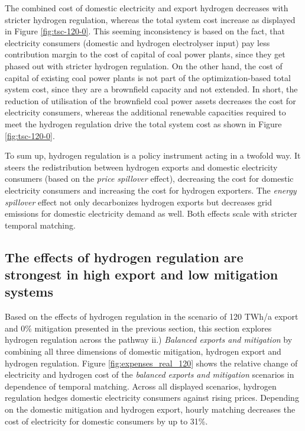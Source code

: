 The combined cost of domestic electricity and export hydrogen decreases with stricter hydrogen regulation, whereas the total system cost increase as displayed in Figure \ref{fig:tsc-120-0}. This seeming inconsistency is based on the fact, that electricity consumers (domestic and hydrogen electrolyser input) pay less contribution margin to the cost of capital of coal power plants, since they get phased out with stricter hydrogen regulation. On the other hand, the cost of capital of existing coal power plants is not part of the optimization-based total system cost, since they are a brownfield capacity and not extended. In short, the reduction of utilisation of the brownfield coal power assets decreases the cost for electricity consumers, whereas the additional renewable capacities required to meet the hydrogen regulation drive the total system cost as shown in Figure \ref{fig:tsc-120-0}. 


To sum up, hydrogen regulation is a policy instrument acting in a twofold way. It steers the redistribution between hydrogen exports and domestic electricity consumers (based on the \textit{price spillover} effect), decreasing the cost for domestic electricity consumers and increasing the cost for hydrogen exporters. The \textit{energy spillover} effect not only decarbonizes hydrogen exports but decreases grid emissions for  domestic electricity demand as well. Both effects scale with stricter temporal matching.



\subsection*{The effects of hydrogen regulation are strongest in high export and low mitigation systems}
\label{subsec:rule_all}

Based on the effects of hydrogen regulation in the scenario of 120 TWh/a export and 0\% mitigation presented in the previous section, this section explores hydrogen regulation across the pathway ii.) \textit{Balanced exports and mitigation} by combining all three dimensions of domestic mitigation, hydrogen export and hydrogen regulation. Figure \ref{fig:expenses_real_120} shows the relative change of electricity and hydrogen cost of the \textit{balanced exports and mitigation} scenarios in dependence of temporal matching. 
Across all displayed scenarios, hydrogen regulation hedges domestic electricity consumers against rising prices. Depending on the domestic mitigation and hydrogen export, hourly matching decreases the cost of electricity for domestic consumers by up to 31\%.

